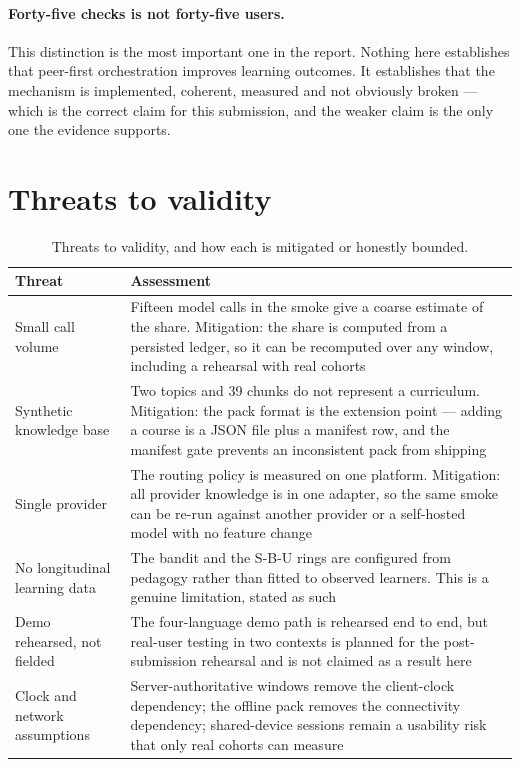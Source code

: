 \paragraph{Forty-five checks is not forty-five users.} This distinction is the most
important one in the report. Nothing here establishes that peer-first orchestration improves
learning outcomes. It establishes that the mechanism is implemented, coherent, measured and
not obviously broken --- which is the correct claim for this submission, and the weaker
claim is the only one the evidence supports.

\section{Threats to validity}
\label{sec:threats}

\begin{table}[htbp]
\centering
\caption{Threats to validity, and how each is mitigated or honestly bounded.}
\label{tab:threats}
\footnotesize
\begin{tabularx}{\textwidth}{@{}p{3.0cm}X@{}}
\toprule
\textbf{Threat} & \textbf{Assessment} \\
\midrule
Small call volume & Fifteen model calls in the smoke give a coarse estimate of the share.
  Mitigation: the share is computed from a persisted ledger, so it can be recomputed
  over any window, including a rehearsal with real cohorts \\
Synthetic knowledge base & Two topics and 39 chunks do not represent a curriculum.
  Mitigation: the pack format is the extension point --- adding a course is a JSON file
  plus a manifest row, and the manifest gate prevents an inconsistent pack from shipping \\
Single provider & The routing policy is measured on one platform. Mitigation: all provider
  knowledge is in one adapter, so the same smoke can be re-run against another provider or
  a self-hosted model with no feature change \\
No longitudinal learning data & The bandit and the S-B-U rings are configured from
  pedagogy rather than fitted to observed learners. This is a genuine limitation, stated
  as such \\
Demo rehearsed, not fielded & The four-language demo path is rehearsed end to end, but
  real-user testing in two contexts is planned for the post-submission rehearsal and is not
  claimed as a result here \\
Clock and network assumptions & Server-authoritative windows remove the client-clock
  dependency; the offline pack removes the connectivity dependency; shared-device sessions
  remain a usability risk that only real cohorts can measure \\
\bottomrule
\end{tabularx}
\end{table}

